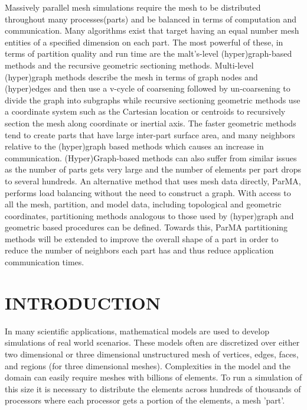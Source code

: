 \documentclass{thesis}
\author{Gerrett Diamond, Cameron Smith}
\begin{document}
 
\titlepage             %
\tableofcontents       %

Massively parallel mesh simulations require the mesh to be distributed
throughout many processes(parts) and be balanced in terms of computation and
communication. 
Many algorithms exist that target having an equal number mesh entities of a
specified dimension on each part. 
The most powerful of these, in terms of partition quality and run time are the
malt's-level (hyper)graph-based methods and the recursive geometric sectioning
methods. 
Multi-level (hyper)graph methods describe the mesh in terms of graph nodes and
(hyper)edges and then use a v-cycle of coarsening followed by un-coarsening to
divide the graph into subgraphs while recursive sectioning geometric methods use
a coordinate system such as the Cartesian location or centroids to recursively
section the mesh along coordinate or inertial axis. 
The faster geometric methods tend to create parts that have large inter-part
surface area, and many neighbors relative to the (hyper)graph based methods
which causes an increase in communication.
(Hyper)Graph-based methods can also suffer from similar issues as the number of
parts gets very large and the number of elements per part drops to several
hundreds. 
An alternative method that uses mesh data directly, ParMA, performs load 
balancing without the need to construct a graph. 
With access to all the mesh, partition, and model data, including topological 
and geometric coordinates, partitioning methods analogous to those used by 
(hyper)graph and geometric based procedures can be defined.
Towards this, ParMA partitioning methods will be extended to improve the 
overall shape of a part in order to reduce the number of neighbors each part 
has and thus reduce application communication times.

\newpage

\begingroup
\let\clearpage\relax

\chapter{INTRODUCTION}

In many scientific applications, mathematical models are used to develop 
simulations of real world scenarios. These models often are discretized over
either two dimensional or three dimensional unstructured mesh of vertices, 
edges, 
faces, and regions (for three dimensional meshes).  Complexities in the model 
and the domain can easily require meshes with billions of elements.
To run a simulation of this size it is necessary to distribute the elements 
across hundreds of thousands of processors where each processor gets a portion 
of the elements, a mesh 'part'.
\end{document}
